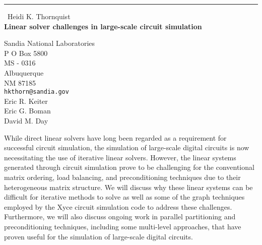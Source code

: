 \documentclass{report}
\begin{document}
\begin{center}
\rule{6in}{1pt} \
{\large Heidi K. Thornquist \\
{\bf Linear solver challenges in large-scale circuit simulation}}

Sandia National Laboratories \\ P O Box 5800 \\ MS - 0316 \\ Albuquerque \\ NM 87185
\\
{\tt hkthorn@sandia.gov}\\
Eric R. Keiter\\
Eric G. Boman\\
David M. Day\end{center}

While direct linear solvers have long been regarded as a requirement for
successful circuit simulation, the simulation of large-scale digital
circuits is now necessitating the use of iterative linear solvers.
However, the linear systems generated through circuit simulation prove to
be challenging for the conventional matrix ordering, load balancing, and
preconditioning techniques due to their heterogeneous matrix structure.
We will discuss why these linear systems can be difficult for iterative
methods to solve as well as some of the graph techniques employed by the
Xyce circuit simulation code to address these challenges. Furthermore, we
will also discuss ongoing work in parallel partitioning and
preconditioning techniques, including some multi-level approaches, that
have proven useful for the simulation of large-scale digital circuits.
\end{document}
